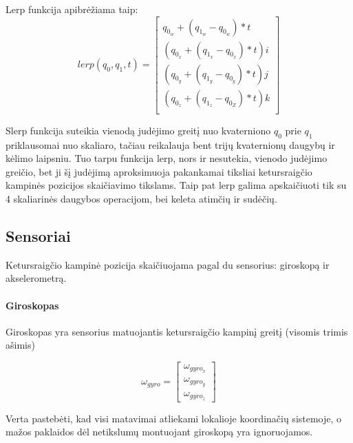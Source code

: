 \documentclass[12pt, a4paper, lithuanian, final]{article}
\begin{document}
Lerp funkcija apibrėžiama taip:
\begin{equation}
	lerp(q_0, q_1, t) = \left[
		\begin{array}{c}
			q_{0_w} + (q_{1_w} - q_{0_w}) * t \\
			(q_{0_x} + (q_{1_x} - q_{0_x}) * t) i \\
			(q_{0_y} + (q_{1_y} - q_{0_y}) * t) j \\
			(q_{0_z}+ (q_{1_z} - q_{0_Z}) * t) k \\
		\end{array}
	\right]
\end{equation}

Slerp funkcija suteikia vienodą judėjimo greitį nuo kvaterniono $q_0$ prie $q_1$ priklausomai nuo skaliaro, tačiau reikalauja bent trijų kvaternionų daugybų ir kėlimo laipsniu.
Tuo tarpu funkcija lerp, nors ir nesutekia, vienodo judėjimo greičio, bet ji šį judėjimą aproksimuoja pakankamai tiksliai ketursraigčio kampinės pozicijos skaičiavimo tikslams.
Taip pat lerp galima apskaičiuoti tik su 4 skaliarinės daugybos operacijom, bei keleta atimčių ir sudėčių.








\subsection{Sensoriai}

Ketursraigčio kampinė pozicija skaičiuojama pagal du sensorius: giroskopą ir akselerometrą.

\paragraph{Giroskopas} Giroskopas yra sensorius matuojantis ketursraigčio kampinį greitį (visomis trimis ašimis)

\begin{equation}
	\omega_{gyro} = \left[
		\begin{array}{c}
			\omega_{gyro_x} \\
			\omega_{gyro_y} \\
			\omega_{gyro_z}
		\end{array}
	\right]
\end{equation}

Verta pastebėti, kad visi matavimai atliekami lokalioje koordinačių sistemoje, o mažos paklaidos dėl netikslumų montuojant giroskopą yra ignoruojamos.
\end{document}
